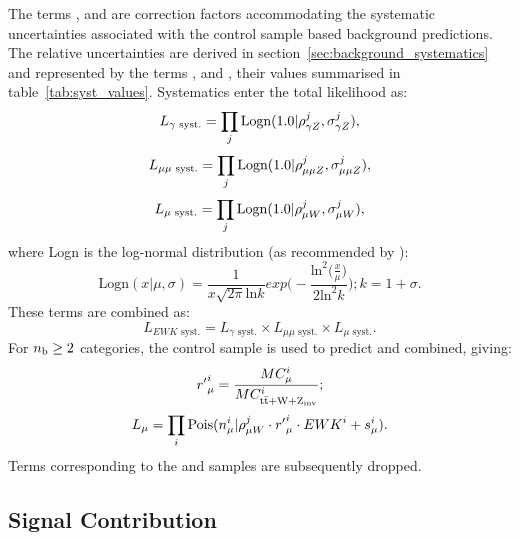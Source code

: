 The terms \rhopz, \rhommz and \rhomw are correction factors accommodating the
systematic uncertainties associated with the control sample based background 
predictions. The relative uncertainties are derived in
section~\ref{sec:background_systematics} and represented by the terms \sigmapz, \sigmammz
and \sigmamw, their 
values summarised in table~\ref{tab:syst_values}. Systematics enter the total
likelihood as:
% 
\begin{equation}
L_{\gamma\text{ syst.}} = \prod_j \text{Logn}(1.0 | \rho^j_{\gamma Z}, \sigma^j_{\gamma Z}),
\end{equation}
\begin{equation}
L_{\mu\mu\text{ syst.}} = \prod_j \text{Logn}(1.0 | \rho^j_{\mu\mu Z}, \sigma^j_{\mu\mu Z}),
\end{equation}
\begin{equation}
L_{\mu\text{ syst.}} = \prod_j \text{Logn}(1.0 | \rho^j_{\mu W}, \sigma^j_{\mu W}),
\end{equation}
% 
where Logn is the log-normal distribution (as recommended by \cite{cousins-log-normal}):
% 
\begin{equation}
\text{Logn}(x|\mu, \sigma) = \frac{1}{x\sqrt{2\pi}\text{ln}k} exp \Bigg(-\frac{\text{ln}^2 \big(\frac{x}{\mu}\big)}{2\text{ln}^2k}\Bigg); \xspace k = 1+\sigma .
\end{equation}
% 
These terms are combined as:
% 
\begin{equation}
L_{EWK\text{ syst.}} = L_{\gamma\text{ syst.}} \times L_{\mu\mu\text{ syst.}} \times L_{\mu\text{ syst.}}.
\end{equation}
% 
For $n_{\text{b}} \geq 2$ categories, the \mj control sample is used to predict \zinv and
\ttw combined, giving:
% 
\begin{equation}
{r'}^i_{\mu} = \frac{MC_{\mu}^i}{MC^i_{\rm{t}\bar{\rm{t}} + W + Z_{\text{inv}}}};
\end{equation}
% 
\begin{equation}
L_{\mu} = \prod_i \text{Pois}(n_{\mu}^i | \rho^j_{\mu W} \cdot {r'}_{\mu}^i \cdot {EWK}^i + s_{\mu}^i).
\end{equation}
% 
Terms corresponding to the \mmj and \gj samples are subsequently dropped.

\subsection{Signal Contribution}

